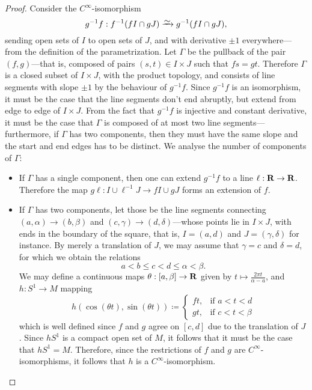 \begin{proof}
Consider the \(C^{\infty}\)-isomorphism
\[
g^{-1} f: f^{-1}(f I \cap g J) \isoto g^{-1}(f I \cap g J),
\]
sending open sets of \(I\) to open sets of \(J\), and with derivative \(\pm 1\)
everywhere---from the definition of the parametrization. Let \(\Gamma\) be the
pullback of the pair \((f, g)\)---that is, composed of pairs
\((s, t) \in I \times J\) such that \(f s = g t\). Therefore \(\Gamma\) is a
closed subset of \(I \times J\), with the product topology, and consists of line
segments with slope \(\pm 1\) by the behaviour of \(g^{-1} f\). Since
\(g^{-1} f\) is an isomorphism, it must be the case that the line segments don't
end abruptly, but extend from edge to edge of \(I \times J\). From the fact that
\(g^{-1} f\) is injective and constant derivative, it must be the case that
\(\Gamma\) is composed of at most two line segments---furthermore, if \(\Gamma\)
has two components, then they must have the same slope and the start and end
edges has to be distinct. We analyse the number of components of \(\Gamma\):
\begin{itemize}\setlength\itemsep{0em}
\item If \(\Gamma\) has a single component, then one can extend \(g^{-1} f\) to
  a line \(\ell: \mathbf{R} \to \mathbf{R}\). Therefore the map
  \(g \ell: I \cup \ell^{-1} J \to f I \cup g J\) forms an extension of \(f\).

\item If \(\Gamma\) has two components, let those be the line segments
  connecting \((a, \alpha) \to (b, \beta)\) and
  \((c, \gamma) \to (d, \delta)\)---whose points lie in \(I \times J\), with
  ends in the boundary of the square, that is, \(I = (a, d)\) and
  \(J = (\gamma, \delta)\) for instance. By merely a translation of \(J\), we
  may assume that \(\gamma = c\) and \(\delta = d\), for which we obtain the
  relations
  \[
  a < b \leq c < d \leq \alpha < \beta.
  \]
  We may define a continuous maps \(\theta: [a, \beta] \to \mathbf{R}\) given by
  \(t \mapsto \frac{2 \pi t}{\alpha - a}\), and \(h: S^1 \to M\) mapping
  \[
  h(\cos(\theta t), \sin(\theta t)) \coloneq
  \begin{cases}
  f t, &\text{if } a < t < d \\
  g t, &\text{if } c < t < \beta
  \end{cases}
  \]
  which is well defined since \(f\) and \(g\) agree on \([c, d]\) due to the
  translation of \(J\). Since \(h S^1\) is a compact open set of \(M\), it
  follows that it must be the case that \(h S^1 = M\). Therefore, since the
  restrictions of \(f\) and \(g\) are \(C^{\infty}\)-isomorphisms, it follows
  that \(h\) is a \(C^{\infty}\)-isomorphism.
\end{itemize}
\end{proof}

